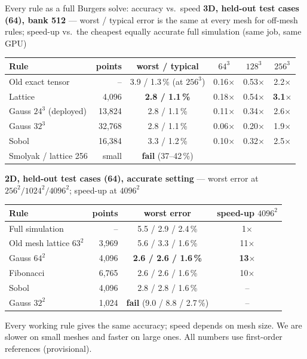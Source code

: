 \documentclass[aspectratio=169,11pt]{beamer}
\begin{document}
\begin{frame}{Every rule as a full Burgers solve: accuracy vs.\ speed}
\footnotesize
\textbf{3D, held-out test cases (64), bank 512} --- worst / typical error is the same at every mesh for off-mesh rules; speed-up vs.\ the cheapest equally accurate full simulation (same job, same GPU)
\par\vspace{0.2em}
\begin{tabular}{lrcccc}
\hline
Rule & points & worst / typical & $64^3$ & $128^3$ & $256^3$\\\hline
Old exact tensor & -- & 3.9 / 1.3\,\% (at $256^3$) & 0.16$\times$ & 0.53$\times$ & 2.2$\times$\\
Lattice & 4{,}096 & \textbf{2.8 / 1.1\,\%} & 0.18$\times$ & 0.54$\times$ & \textbf{3.1$\times$}\\
Gauss $24^3$ (deployed) & 13{,}824 & 2.8 / 1.1\,\% & 0.11$\times$ & 0.34$\times$ & 2.6$\times$\\
Gauss $32^3$ & 32{,}768 & 2.8 / 1.1\,\% & 0.06$\times$ & 0.20$\times$ & 1.9$\times$\\
Sobol & 16{,}384 & 3.3 / 1.2\,\% & 0.10$\times$ & 0.32$\times$ & 2.5$\times$\\
Smolyak / lattice 256 & small & \textbf{fail} (37--42\,\%) & & & \\\hline
\end{tabular}
\par\vspace{0.5em}
\textbf{2D, held-out test cases (64), accurate setting} --- worst error at $256^2 / 1024^2 / 4096^2$; speed-up at $4096^2$
\par\vspace{0.2em}
\begin{tabular}{lrcc}
\hline
Rule & points & worst error & speed-up $4096^2$\\\hline
Full simulation & -- & 5.5 / 2.9 / 2.4\,\% & 1$\times$\\
Old mesh lattice $63^2$ & 3{,}969 & 5.6 / 3.3 / 1.6\,\% & 11$\times$\\
Gauss $64^2$ & 4{,}096 & \textbf{2.6 / 2.6 / 1.6\,\%} & \textbf{13$\times$}\\
Fibonacci & 6{,}765 & 2.6 / 2.6 / 1.6\,\% & 10$\times$\\
Sobol & 4{,}096 & 2.8 / 2.8 / 1.6\,\% & --\\
Gauss $32^2$ & 1{,}024 & \textbf{fail} (9.0 / 8.8 / 2.7\,\%) & --\\\hline
\end{tabular}
\par\vspace{0.4em}
Every working rule gives the same accuracy; speed depends on mesh size. We are slower on small meshes and faster on large ones. All numbers use first-order references (provisional).
\end{frame}
\end{document}
